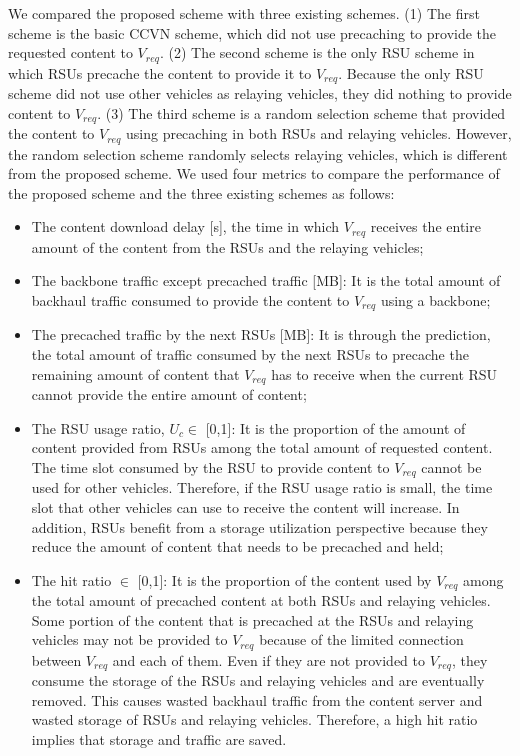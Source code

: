 \documentclass[electronics,aricle,accept,pdftex,moreauthors]{Definitions/mdpi}
\begin{document}
We compared the proposed scheme with three existing schemes. (1) The first scheme is the basic CCVN scheme, which did not use precaching to provide the requested content to ${V}_{req}$. (2) The second scheme is the only RSU scheme in which RSUs precache the content to provide it to ${V}_{req}$. Because the only RSU scheme did not use other vehicles as relaying vehicles, they did nothing to provide content to ${V}_{req}$. (3) The third scheme is a random selection scheme that provided the content to ${V}_{req}$ using precaching in both RSUs and relaying vehicles. However, the random selection scheme randomly selects relaying vehicles, which is different from the proposed scheme. We used four metrics to compare the performance of the proposed scheme and the three existing schemes as follows:
\begin{itemize}
    \item The content download delay [s], the time in which ${V}_{req}$ receives the entire amount of the content from the RSUs and the relaying vehicles;
    \item The backbone traffic except precached traffic [MB]: It is the total amount of backhaul traffic consumed to provide the content to ${V}_{req}$ using a backbone;
    \item The precached traffic by the next RSUs [MB]: It is through the prediction, the total amount of traffic consumed by the next RSUs to precache the remaining amount of content that ${V}_{req}$ has to receive when the current RSU cannot provide the entire amount of content;
    \item The RSU usage ratio, $U_{c}\in$ [0,1]: It is the proportion of the amount of content provided from RSUs among the total amount of requested content. The time slot consumed by the RSU to provide content to ${V}_{req}$ cannot be used for other vehicles. Therefore, if the RSU usage ratio is small, the time slot that other vehicles can use to receive the content will increase. In addition, RSUs benefit from a storage utilization perspective because they reduce the amount of content that needs to be precached and held;
    \item The hit ratio $\in$ [0,1]: It is the proportion of the content used by ${V}_{req}$ among the total amount of precached content at both RSUs and relaying vehicles. Some portion of the content that is precached at the RSUs and relaying vehicles may not be provided to ${V}_{req}$ because of the limited connection between ${V}_{req}$ and each of them. Even if they are not provided to ${V}_{req}$, they consume the storage of the RSUs and relaying vehicles and are eventually removed. This causes wasted backhaul traffic from the content server and wasted storage of RSUs and relaying vehicles. Therefore, a high hit ratio implies that storage and traffic are saved.
\end{itemize}
\end{document}
